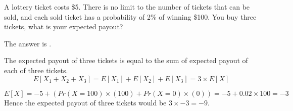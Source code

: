 \documentclass{ximera}
\begin{document}
\begin{question}
A lottery ticket costs \$5.  There is no limit to the number of
tickets that can be sold, and each sold ticket has a probability of
2\% of winning \$100.  You buy three tickets, what is your expected
payout?

\begin{solution}
The answer is .
\end{solution}

The expected payout of three tickets is equal to the sum of expected
payout of each of three tickets.
\[
E[X_1 + X_2 + X_3] = E[X_1] + E[X_2] + E[X_3] = 3 \times E[X]
\]

\[
E[X] = -5 + \left(Pr(X = 100) \times (100) + Pr(X = 0) \times (0)\right) = -5 + 0.02 \times 100 = -3
\]
Hence the expected payout of three tickets would be $3 \times -3 = -9$.
\end{question}
\end{document}
